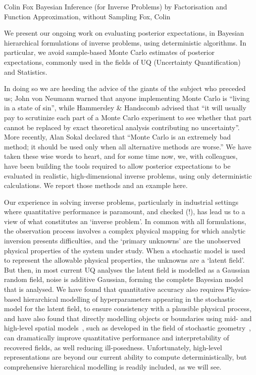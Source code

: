 \documentclass{owrart}
\theoremstyle{plain}
\begin{document}
\begin{talk}{Colin Fox}
{Bayesian Inference (for Inverse Problems) by Factorisation and Function Approximation, without Sampling}
{Fox, Colin}

\noindent
We present our ongoing work on evaluating posterior expectations, in Bayesian hierarchical formulations
of inverse problems, using deterministic algorithms. In particular, we avoid sample-based Monte Carlo estimates of posterior expectations, commonly used in the fields of UQ (Uncertainty Quantification) and Statistics.

In doing so we are heeding the advice of the giants of the subject who preceded us; John von Neumann warned that anyone implementing Monte Carlo is ``living in a state of sin'', while Hammersley \& Handscomb advised that ``it will usually pay to scrutinize each part of a Monte Carlo experiment to see whether that part cannot be replaced by exact theoretical analysis contributing no uncertainty''. More recently, Alan Sokal declared that ``Monte Carlo is an extremely bad method; it should be used only when all alternative methods are worse.'' We have taken these wise words to heart, and for some time now, we, with colleagues, have been building the tools required to allow posterior expectations to be evaluated in realistic, high-dimensional inverse problems, using only deterministic calculations. We report those methods and an example here.

Our experience in solving inverse problems, particularly in industrial settings where quantitative performance is paramount, and checked (!), has lead us to a view of what constitutes an `inverse problem'. In common with all formulations, the observation process involves a complex physical mapping for which analytic inversion presents difficulties, and the `primary unknowns' are the unobserved physical properties of the system under study. When a stochastic model is used to represent the allowable physical properties, the unknowns are a `latent field'. But then, in most current UQ analyses the latent field is modelled as a Gaussian random field, noise is additive Gaussian, forming the complete Bayesian model that is analysed. We have found that quantitative accuracy also requires Physics-based hierarchical modelling of hyperparameters appearing in the stochastic model for the latent field, to ensure consistency with a plausible physical process, and have also found that directly modelling objects or boundaries using mid- and high-level spatial models~\cite{HurnHusbyRue2003}, such as developed in the field of stochastic geometry~\cite{stoyan2013stochastic}, can dramatically improve quantitative performance and interpretability of recovered fields, as well reducing ill-posedness. Unfortunately, high-level representations are beyond our current ability to compute deterministically, but comprehensive hierarchical modelling is readily included, as we will see.


\end{talk}
\end{document}
